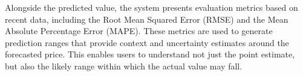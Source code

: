Alongside the predicted value, the system presents evaluation metrics based on recent data, including the Root Mean Squared Error (RMSE) and the Mean Absolute Percentage Error (MAPE). These metrics are used to generate prediction ranges that provide context and uncertainty estimates around the forecasted price. This enables users to understand not just the point estimate, but also the likely range within which the actual value may fall.


